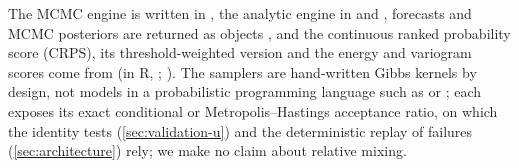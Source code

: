 The MCMC engine is written in  \citep{bradbury2018jax,frostig2018compiling}, the analytic engine in  \citep{harris2020array} and  \citep{virtanen2020scipy}, forecasts and MCMC posteriors are returned as  objects \citep{hoyer2017xarray}, and the continuous ranked probability score (CRPS), its threshold-weighted version and the energy and variogram scores come from  \citep{zanetta2024scoringrules} (in R, ; \citealp{jordan2019evaluating}). %
The samplers are hand-written Gibbs kernels by design, not models in a probabilistic programming language such as  \citep{abrilpla2023pymc} or  \citep{phan2019composable}; %
each exposes its exact conditional or Metropolis--Hastings acceptance ratio, on which the identity tests (\cref{sec:validation-u}) and the deterministic replay of failures (\cref{sec:architecture}) rely; we make no claim about relative mixing. %

